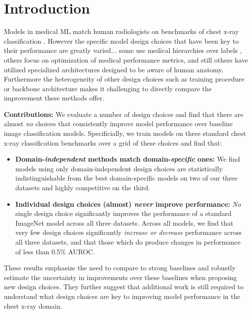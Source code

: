 \section{Introduction}
Models in medical ML match human radiologists on benchmarks of chest x-ray classification \citep{pham2021interpreting, yuan2020large, ye2020weakly, kamal2022anatomy,irvin2019chexpert,johnson2019mimic}. However the specific model design choices that have been key to their performance are greatly varied... some use medical hierarchies over labels \citep{pham2021interpreting}, others focus on optimization of medical performance metrics\citep{yuan2020large}, and still others have utilized specialized architectures designed to be aware of human anatomy\citep{kamal2022anatomy}. Furthermore the heterogeneity of other design choices such as training procedure or backbone architecture makes it challenging to directly compare the improvement these methods offer.

\textbf{Contributions:} We evaluate a number of design choices and find that there are almost \emph{no} choices that consistently improve model performance over baseline image classification models. Specificially, we train models on three standard chest x-ray classification benchmarks over a grid of these choices and find that:
\begin{itemize}
    \item \textbf{Domain-\emph{independent} methods match domain-\emph{specific} ones:} We find models using only domain-independent design choices are statistically indistinguishable from the best domain-specific models on two of our three datasets and highly competitive on the third.
    \item \textbf{Individual design choices (almost) \emph{never} improve performance:} \emph{No} single design choice significantly improves the performance of a standard ImageNet model across all three datasets. Across all models, we find that very few design choices significantly \emph{increase or decrease} performance across all three datasets, and that those which do produce changes in performance of less than 0.5\% AUROC.
\end{itemize}

These results emphasize the need to compare to strong baselines and robustly estimate the uncertainty in improvements over these baselines when proposing new design choices. They further suggest that additional work is still required to understand what design choices are key to improving model performance in the chest x-ray domain. 

